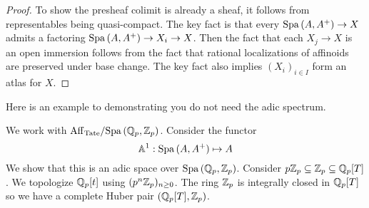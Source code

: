 \documentclass{article}
\begin{document}
\begin{proof}
  To show the presheaf colimit is already a sheaf,
  it follows from representables being quasi-compact.
  The key fact is that 
  every $\mathrm{Spa}\, (A , A^+) \to X$ admits 
  a factoring $\mathrm{Spa}\,(A , A^+) \to X_i \to X$.
  Then the fact that each $X_j \to X$ is an open immersion follows from
  the fact that rational localizations of affinoids
  are preserved under base change.
  The key fact also implies $(X_i)_{i \in I}$ form an atlas for $X$.
\end{proof}

Here is an example to demonstrating you do not need the adic spectrum.
\begin{eg}
  We work with $\mathrm{Aff}_{\mathrm{Tate}} / \mathrm{Spa}\,(\mathbb{Q}_p , \mathbb{Z}_p)$.
  Consider the functor \[
    \mathbb{A}^1 : \mathrm{Spa}\,(A , A^+) \mapsto A
  \]
  We show that this is an adic space over $\mathrm{Spa}\,(\mathbb{Q}_p , \mathbb{Z}_p)$.
  Consider $p \mathbb{Z}_p \subseteq \mathbb{Z}_p \subseteq \mathbb{Q}_p[T]$.
  We topologize $\mathbb{Q}_p[t]$ using $(p^n \mathbb{Z}_p)_{n \geq 0}$.
  The ring $\mathbb{Z}_p$ is integrally closed in $\mathbb{Q}_p[T]$ 
  so we have a complete Huber pair $(\mathbb{Q}_p[T] , \mathbb{Z}_p)$.
  \begin{lem}
    

\end{lem}
\end{eg}
\end{document}
